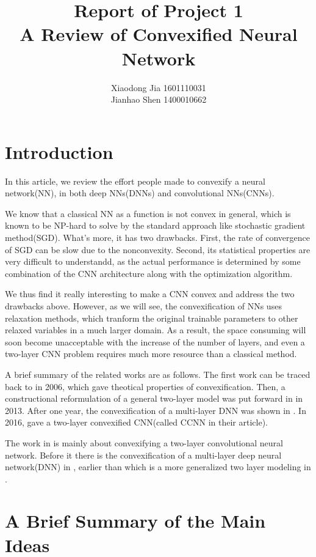 \documentclass{article}
\title{Report of Project 1\\A Review of Convexified Neural Network}
\author{Xiaodong Jia 1601110031\\Jianhao Shen 1400010662}
\begin{document}
\maketitle

\tableofcontents
\newpage

\section{Introduction}
In this article, we review the effort people made to convexify a neural network(NN), in both deep NNs(DNNs) and convolutional NNs(CNNs).

We know that a classical NN as a function is not convex in general, which is known to be NP-hard to solve by the standard approach like stochastic gradient method(SGD). What's more, it has two drawbacks. First, the rate of convergence of SGD can be slow due to the nonconvexity. Second, its statistical properties are very difficult to understandd, as the actual performance is determined by some combination of the CNN architecture along with the optimization algorithm.

We thus find it really interesting to make a CNN convex and address the two drawbacks above. However, as we will see, the convexification of NNs uses relaxation methods, which tranform the original trainable parameters to other relaxed variables in a much larger domain. As a result, the space consuming will soon become unacceptable with the increase of the number of layers, and even a two-layer CNN problem requires much more resource than a classical method.

A brief summary of the related works are as follows. The first work can be traced back to \cite{bengio2006convex} in 2006, which gave theotical properties of convexification. Then,  a constructional reformulation of a general two-layer model was put forward in \cite{aslan2013convex} in 2013. After one year, the convexification of a multi-layer DNN was shown in \cite{aslan2014convex}. In 2016, \cite{zhang2016convexified} gave a two-layer convexified CNN(called CCNN in their article).

The work in \cite{zhang2016convexified} is mainly about convexifying a two-layer convolutional neural network. Before it there is the convexification of a multi-layer deep neural network(DNN) in \cite{aslan2014convex}, earlier than which is a more generalized two layer modeling in \cite{aslan2013convex}.

\section{A Brief Summary of the Main Ideas}
\end{document}

